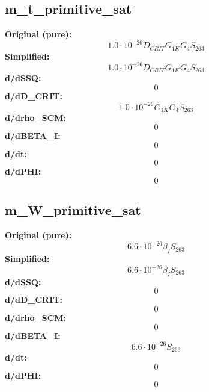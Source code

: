 \subsection{m_t_primitive_sat}
\textbf{Original (pure):}
\begin{equation}
1.0 \cdot 10^{-26} D_{CRIT} G_{1 K} G_{4} S_{26 3}
\end{equation}
\textbf{Simplified:}
\begin{equation}
1.0 \cdot 10^{-26} D_{CRIT} G_{1 K} G_{4} S_{26 3}
\end{equation}
\textbf{d/dSSQ:}
\begin{equation}
0
\end{equation}
\textbf{d/dD_CRIT:}
\begin{equation}
1.0 \cdot 10^{-26} G_{1 K} G_{4} S_{26 3}
\end{equation}
\textbf{d/drho_SCM:}
\begin{equation}
0
\end{equation}
\textbf{d/dBETA_I:}
\begin{equation}
0
\end{equation}
\textbf{d/dt:}
\begin{equation}
0
\end{equation}
\textbf{d/dPHI:}
\begin{equation}
0
\end{equation}

\subsection{m_W_primitive_sat}
\textbf{Original (pure):}
\begin{equation}
6.6 \cdot 10^{-26} \beta_{I} S_{26 3}
\end{equation}
\textbf{Simplified:}
\begin{equation}
6.6 \cdot 10^{-26} \beta_{I} S_{26 3}
\end{equation}
\textbf{d/dSSQ:}
\begin{equation}
0
\end{equation}
\textbf{d/dD_CRIT:}
\begin{equation}
0
\end{equation}
\textbf{d/drho_SCM:}
\begin{equation}
0
\end{equation}
\textbf{d/dBETA_I:}
\begin{equation}
6.6 \cdot 10^{-26} S_{26 3}
\end{equation}
\textbf{d/dt:}
\begin{equation}
0
\end{equation}
\textbf{d/dPHI:}
\begin{equation}
0
\end{equation}

